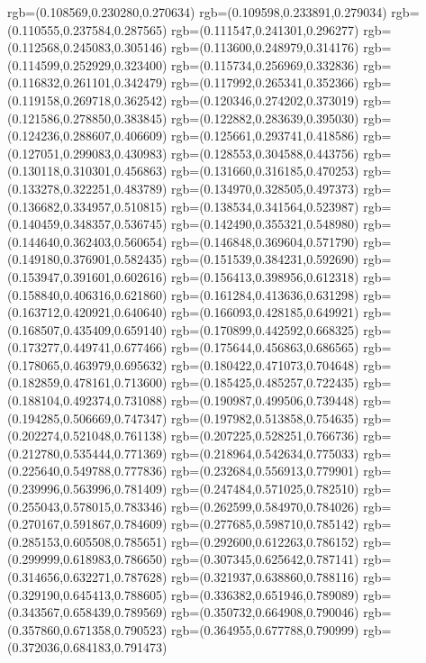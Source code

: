 {{{			rgb=(0.108569,0.230280,0.270634)
			rgb=(0.109598,0.233891,0.279034)
			rgb=(0.110555,0.237584,0.287565)
			rgb=(0.111547,0.241301,0.296277)
			rgb=(0.112568,0.245083,0.305146)
			rgb=(0.113600,0.248979,0.314176)
			rgb=(0.114599,0.252929,0.323400)
			rgb=(0.115734,0.256969,0.332836)
			rgb=(0.116832,0.261101,0.342479)
			rgb=(0.117992,0.265341,0.352366)
			rgb=(0.119158,0.269718,0.362542)
			rgb=(0.120346,0.274202,0.373019)
			rgb=(0.121586,0.278850,0.383845)
			rgb=(0.122882,0.283639,0.395030)
			rgb=(0.124236,0.288607,0.406609)
			rgb=(0.125661,0.293741,0.418586)
			rgb=(0.127051,0.299083,0.430983)
			rgb=(0.128553,0.304588,0.443756)
			rgb=(0.130118,0.310301,0.456863)
			rgb=(0.131660,0.316185,0.470253)
			rgb=(0.133278,0.322251,0.483789)
			rgb=(0.134970,0.328505,0.497373)
			rgb=(0.136682,0.334957,0.510815)
			rgb=(0.138534,0.341564,0.523987)
			rgb=(0.140459,0.348357,0.536745)
			rgb=(0.142490,0.355321,0.548980)
			rgb=(0.144640,0.362403,0.560654)
			rgb=(0.146848,0.369604,0.571790)
			rgb=(0.149180,0.376901,0.582435)
			rgb=(0.151539,0.384231,0.592690)
			rgb=(0.153947,0.391601,0.602616)
			rgb=(0.156413,0.398956,0.612318)
			rgb=(0.158840,0.406316,0.621860)
			rgb=(0.161284,0.413636,0.631298)
			rgb=(0.163712,0.420921,0.640640)
			rgb=(0.166093,0.428185,0.649921)
			rgb=(0.168507,0.435409,0.659140)
			rgb=(0.170899,0.442592,0.668325)
			rgb=(0.173277,0.449741,0.677466)
			rgb=(0.175644,0.456863,0.686565)
			rgb=(0.178065,0.463979,0.695632)
			rgb=(0.180422,0.471073,0.704648)
			rgb=(0.182859,0.478161,0.713600)
			rgb=(0.185425,0.485257,0.722435)
			rgb=(0.188104,0.492374,0.731088)
			rgb=(0.190987,0.499506,0.739448)
			rgb=(0.194285,0.506669,0.747347)
			rgb=(0.197982,0.513858,0.754635)
			rgb=(0.202274,0.521048,0.761138)
			rgb=(0.207225,0.528251,0.766736)
			rgb=(0.212780,0.535444,0.771369)
			rgb=(0.218964,0.542634,0.775033)
			rgb=(0.225640,0.549788,0.777836)
			rgb=(0.232684,0.556913,0.779901)
			rgb=(0.239996,0.563996,0.781409)
			rgb=(0.247484,0.571025,0.782510)
			rgb=(0.255043,0.578015,0.783346)
			rgb=(0.262599,0.584970,0.784026)
			rgb=(0.270167,0.591867,0.784609)
			rgb=(0.277685,0.598710,0.785142)
			rgb=(0.285153,0.605508,0.785651)
			rgb=(0.292600,0.612263,0.786152)
			rgb=(0.299999,0.618983,0.786650)
			rgb=(0.307345,0.625642,0.787141)
			rgb=(0.314656,0.632271,0.787628)
			rgb=(0.321937,0.638860,0.788116)
			rgb=(0.329190,0.645413,0.788605)
			rgb=(0.336382,0.651946,0.789089)
			rgb=(0.343567,0.658439,0.789569)
			rgb=(0.350732,0.664908,0.790046)
			rgb=(0.357860,0.671358,0.790523)
			rgb=(0.364955,0.677788,0.790999)
			rgb=(0.372036,0.684183,0.791473)
}}}
